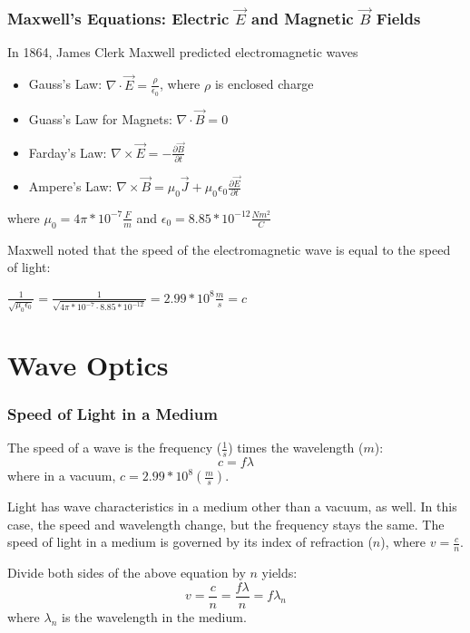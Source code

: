 \documentclass{beamer}
\begin{document}
\begin{frame}\frametitle{Maxwell's Equations: Electric $\vec{E}$ and Magnetic $\vec{B}$ Fields}
In 1864, James Clerk Maxwell predicted electromagnetic waves
\begin{itemize}
\item Gauss's Law: $\nabla \cdot \vec{E} = \frac{\rho}{\epsilon_0}$, where ${\rho}$ is enclosed charge
\item Guass's Law for Magnets: $\nabla \cdot \vec{B} = 0$
\item Farday's Law: $\nabla \times \vec{E} = -\frac{\partial \vec{B}}{\partial t}$
\item Ampere's Law: $\nabla \times \vec{B} = \mu_0 \vec{J} + \mu_0 \epsilon_0 \frac{\partial \vec{E}}{\partial t}$
\end{itemize}

where \newline
$\mu_0 = 4 \pi*10^{-7} \frac{F}{m}$ and 
$\epsilon_0 = 8.85*10^{-12} \frac{N m^2}{C}$ \newline

Maxwell noted that the speed of the electromagnetic wave is equal to the speed of light:


$\frac{1}{\sqrt{\mu_0 \epsilon_0}}= \frac{1}{\sqrt{4 \pi*10^{-7} \cdot 8.85*10^{-12}}} = 2.99*10^{8} \frac{m}{s} = c$
\end{frame}

\section{Wave Optics}

\begin{frame}\frametitle{Speed of Light in a Medium}
The speed of a wave is the frequency ($\frac{1}{s}$) times the wavelength ($m$):
\begin{equation}
c = f \lambda
\end{equation}
where in a vacuum, $c = 2.99 * 10^8 (\frac{m}{s})$. \newline

Light has wave characteristics in a medium other than a vacuum, as well. In this case, the speed and wavelength change, but the frequency stays the same. The speed of light in a medium is governed by its index of refraction ($n$), where $v = \frac{c}{n}$. \newline

Divide both sides of the above equation by $n$ yields:
\begin{equation}
v = \frac{c}{n} = \frac{f \lambda}{n} = f \lambda_n
\end{equation}
where $\lambda_n$ is the wavelength in the medium.
\end{frame}
\end{document}
